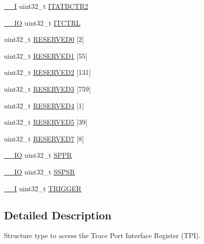 \begin{DoxyCompactItemize}
\item 
\hyperlink{core__cm3_8h_af63697ed9952cc71e1225efe205f6cd3}{\+\_\+\+\_\+I} uint32\+\_\+t \hyperlink{structTPI__Type_a176d991adb4c022bd5b982a9f8fa6a1d}{I\+T\+A\+T\+B\+C\+T\+R2}
\item 
\hyperlink{core__cm3_8h_aec43007d9998a0a0e01faede4133d6be}{\+\_\+\+\_\+\+IO} uint32\+\_\+t \hyperlink{structTPI__Type_ab49c2cb6b5fe082746a444e07548c198}{I\+T\+C\+T\+RL}
\item 
uint32\+\_\+t \hyperlink{structTPI__Type_af143c5e8fc9a3b2be2878e9c1f331aa9}{R\+E\+S\+E\+R\+V\+E\+D0} \mbox{[}2\mbox{]}
\item 
uint32\+\_\+t \hyperlink{structTPI__Type_ac3956fe93987b725d89d3be32738da12}{R\+E\+S\+E\+R\+V\+E\+D1} \mbox{[}55\mbox{]}
\item 
uint32\+\_\+t \hyperlink{structTPI__Type_ac7bbb92e6231b9b38ac483f7d161a096}{R\+E\+S\+E\+R\+V\+E\+D2} \mbox{[}131\mbox{]}
\item 
uint32\+\_\+t \hyperlink{structTPI__Type_a31700c8cdd26e4c094db72af33d9f24c}{R\+E\+S\+E\+R\+V\+E\+D3} \mbox{[}759\mbox{]}
\item 
uint32\+\_\+t \hyperlink{structTPI__Type_a684071216fafee4e80be6aaa932cec46}{R\+E\+S\+E\+R\+V\+E\+D4} \mbox{[}1\mbox{]}
\item 
uint32\+\_\+t \hyperlink{structTPI__Type_a3f80dd93f6bab6524603a7aa58de9a30}{R\+E\+S\+E\+R\+V\+E\+D5} \mbox{[}39\mbox{]}
\item 
uint32\+\_\+t \hyperlink{structTPI__Type_a476ca23fbc9480f1697fbec871130550}{R\+E\+S\+E\+R\+V\+E\+D7} \mbox{[}8\mbox{]}
\item 
\hyperlink{core__cm3_8h_aec43007d9998a0a0e01faede4133d6be}{\+\_\+\+\_\+\+IO} uint32\+\_\+t \hyperlink{structTPI__Type_a3eb655f2e45d7af358775025c1a50c8e}{S\+P\+PR}
\item 
\hyperlink{core__cm3_8h_aec43007d9998a0a0e01faede4133d6be}{\+\_\+\+\_\+\+IO} uint32\+\_\+t \hyperlink{structTPI__Type_a158e9d784f6ee6398f4bdcb2e4ca0912}{S\+S\+P\+SR}
\item 
\hyperlink{core__cm3_8h_af63697ed9952cc71e1225efe205f6cd3}{\+\_\+\+\_\+I} uint32\+\_\+t \hyperlink{structTPI__Type_aa4b603c71768dbda553da571eccba1fe}{T\+R\+I\+G\+G\+ER}
\end{DoxyCompactItemize}


\subsection{Detailed Description}
Structure type to access the Trace Port Interface Register (T\+PI). 


